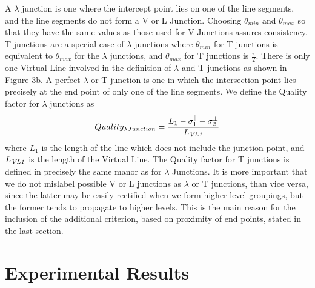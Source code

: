  A $\lambda$ junction is one where the intercept point lies on one of the line 
segments, and the line segments do not form a V or L Junction. Choosing 
$\theta_{min}$ and $\theta_{max}$ so that they have the same values 
as those used for V Junctions assures consistency. T junctions are a special 
case of $\lambda$ junctions where $\theta_{min}$ for T junctions is equivalent 
to $\theta_{max}$ for the $\lambda$ junctions, and $\theta_{max}$ for T 
junctions is $\frac {\pi}{2}$. There is only one Virtual Line involved in the 
definition of $\lambda$ and T junctions as shown in 
Figure 3b. A perfect $\lambda$ or T junction is one in
which the intersection point lies precisely at the end point of only one of
the line segments. We define the Quality factor for $\lambda$ junctions as
\vspace{-2mm}
\begin{equation}
 Quality_{\lambda Junction} = 
\frac {L_{1} - \sigma^{\parallel}_{1} - \sigma^{\perp}_{2}}{L_{\it VL1}}
\end{equation}
\vspace{-2mm}
where $L_{1}$ is the length of the line which does not include the junction
point, and $L_{\it VL1}$ is the length of the Virtual Line. The Quality 
factor for T junctions is defined in precisely the same manor as for 
$\lambda$ Junctions. It is more important that we do not mislabel possible V 
or L junctions as 
$\lambda$ or T junctions, than vice versa, since the latter may be easily 
rectified when we form higher level groupings, but the former tends to 
propagate to higher levels. This is the main reason for the inclusion of the 
additional criterion, based on proximity of end points, stated in the last 
section. 

\section{Experimental Results}


